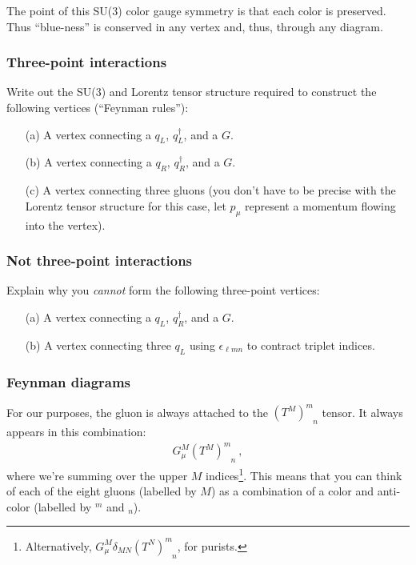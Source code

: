 \documentclass[12pt]{article}
\begin{document}
The point of this SU(3) color gauge symmetry is that each color is preserved. Thus ``blue-ness'' is conserved in any vertex and, thus, through any diagram.

\subsubsection{Three-point interactions}

Write out the SU(3) and Lorentz tensor structure required to construct the following vertices (``Feynman rules''):
\begin{enumerate}
	\item[(a)] A vertex connecting a $q_L$, $q_L^\dag$, and a $G$. 
	\item[(b)] A vertex connecting a $q_R$, $q_R^\dag$, and a $G$. 
	\item[(c)] A vertex connecting three gluons (you don't have to be precise with the Lorentz tensor structure for this case, let $p_\mu$ represent a momentum flowing into the vertex). 
\end{enumerate}

\subsubsection{Not three-point interactions}

Explain why you \emph{cannot} form the following three-point vertices:
\begin{enumerate}
	\item[(a)] A vertex connecting a $q_L$, $q_R^\dag$, and a $G$. 
	\item[(b)] A vertex connecting three $q_L$ using $\epsilon_{\ell m n}$ to contract triplet indices.
\end{enumerate}

\subsubsection{Feynman diagrams}
\label{sec:gluon}

For our purposes, the gluon is always attached to the $(T^M)^m_{\phantom{m}n}$ tensor. It always appears in this combination:
\begin{align}
	G_\mu^M (T^M)^m_{\phantom{m}n} \ ,
\end{align}
where we're summing over the upper $M$ indices\footnote{Alternatively, $G_\mu^M \delta_{MN}(T^N)^m_{\phantom{m}n}$, for purists.}. This means that you can think of each of the eight gluons (labelled by $M$) as a combination of a color and anti-color (labelled by $^m$ and $_n$).
\end{document}
